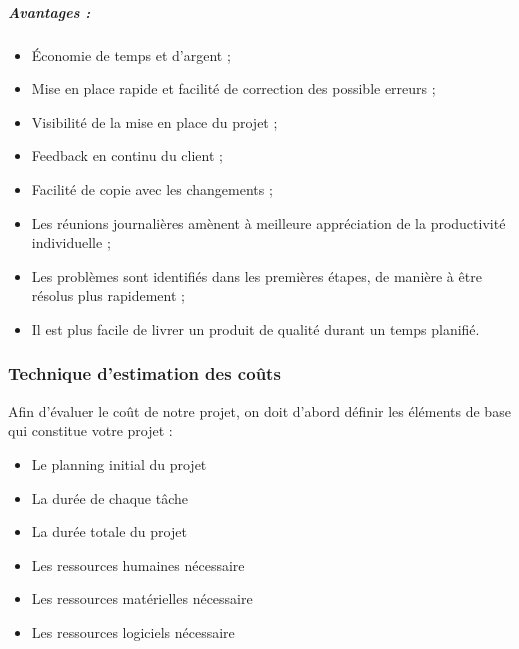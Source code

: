 \subparagraph{Avantages : }
\begin{itemize}
    \item Économie de temps et d'argent ;
    \item Mise en place rapide et facilité de correction des possible erreurs ;
    \item Visibilité de la mise en place du projet ;
    \item Feedback en continu du client ;
    \item Facilité de copie avec les changements ;
    \item Les réunions journalières amènent à meilleure appréciation de la productivité individuelle ;
    \item Les problèmes sont identifiés dans les premières étapes, de manière à être résolus plus rapidement ;
    \item Il est plus facile de livrer un produit de qualité durant un temps planifié.
\end{itemize}

\subsubsection{Technique d’estimation des coûts}
Afin d’évaluer le coût de notre projet, on doit d’abord définir les éléments de base qui constitue votre projet : 
\begin{itemize}
    \item Le planning initial du projet
    \item La durée de chaque tâche
    \item La durée totale du projet
    \item Les ressources humaines nécessaire
    \item Les ressources matérielles nécessaire
    \item Les ressources logiciels nécessaire
\end{itemize}


